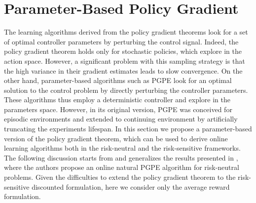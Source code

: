 \chapter{Parameter-Based Policy Gradient}
\label{ch:parameter_based_policy_gradient}

The learning algorithms derived from the policy gradient theorems look for a set of optimal controller parameters by perturbing the control signal. Indeed, the policy gradient theorem holds only for stochastic policies, which explore in the action space.
However, a significant problem with this sampling strategy is that the high variance in their gradient estimates leads to slow convergence. On the other hand, parameter-based algorithms such as \gls{PGPE} look for an optimal solution to the control problem by directly perturbing the controller parameters. These algorithms thus employ a deterministic controller and explore in the parameters space. However, in its original version, \gls{PGPE} was conceived for episodic environments and extended to continuing environment by artificially truncating the experiments lifespan. In this section we propose a parameter-based version of the policy gradient theorem, which can be used to derive online learning algorithms both in the risk-neutral and the risk-sensitive frameworks. The following discussion starts from and generalizes the results presented in \cite{miyamae2010natural}, where the authors propose an online natural \gls{PGPE} algorithm for risk-neutral problems. Given the difficulties to extend the policy gradient theorem to the risk-sensitive discounted formulation, here we consider only the average reward formulation. 

